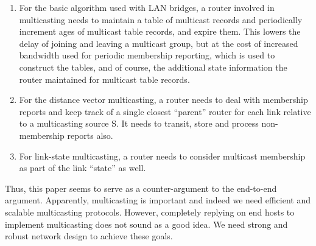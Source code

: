 \documentclass[11pt]{article}
\begin{document}
\begin{enumerate}
\item For the basic algorithm used with LAN bridges, a router involved
  in multicasting needs to maintain a table of multicast records and
  periodically increment ages of multicast table records, and expire
  them. This lowers the delay of joining and leaving a multicast
  group, but at the cost of increased bandwidth used for periodic
  membership reporting, which is used to construct the tables, and
  of course, the additional state information the router maintained
  for multicast table records.
\item For the distance vector multicasting, a router needs to deal
  with membership reports and keep track of a single closest
  ``parent'' router for each link relative to a multicasting source
  S. It needs to transit, store and process non-membership reports
  also.
\item For link-state multicasting, a router needs to consider
  multicast membership as part of the link ``state'' as well.
\end{enumerate}

Thus, this paper seems to serve as a counter-argument to the end-to-end
argument. Apparently, multicasting is important and indeed we need
efficient and scalable multicasting protocols. However, completely
replying on end hosts to implement multicasting does not sound as a
good idea. We need strong and robust network design to achieve these
goals.
\end{document}
